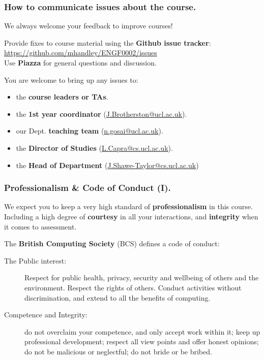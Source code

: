 \documentclass{beamer} %
\newcommand\emc[1]{\textcolor{midred}{\textbf{#1}}}
\begin{document}
\begin{frame}
\frametitle{How to communicate issues about the course.}

We always welcome your feedback to improve courses!

\vspace{3mm}
Provide fixes to course material using the \emc{Github issue tracker}:\\
\url{https://github.com/mhandley/ENGF0002/issues}\\
Use \emc{Piazza} for general questions and discussion.

\vspace{3mm}
You are welcome to bring up any issues to:
\begin{itemize}
	\item the \emc{course leaders or TAs}.
	\item the \emc{1st year coordinator} (\url{J.Brotherston@ucl.ac.uk}).
	\item our Dept. \emc{teaching team} (\url{n.gosai@ucl.ac.uk}).
	\item the \emc{Director of Studies} (\url{L.Capra@cs.ucl.ac.uk}).
	\item the \emc{Head of Department} (\url{J.Shawe-Taylor@cs.ucl.ac.uk})
\end{itemize}

\end{frame}

\begin{frame}
\frametitle{Professionalism \& Code of Conduct (I).}

We expect you to keep a very high standard of \emc{professionalism} in this course. Including a high degree of \emc{courtesy} in all your interactions, and \emc{integrity} when it comes to assessment.

\vspace{3mm}
The \emc{British Computing Society} (BCS) defines a code of conduct:
\begin{description}
	\item[The Public interest:] Respect for public health, privacy, security and wellbeing of others and the environment. Respect the rights of others. Conduct activities without discrimination, and extend to all the benefits of computing.
	\item[Competence and Integrity:] do not overclaim your competence, and only accept work within it; keep up professional development; respect all view points and offer honest opinions; do not be malicious or neglectful; do not bride or be bribed.
\end{description}

\end{frame}
\end{document}
